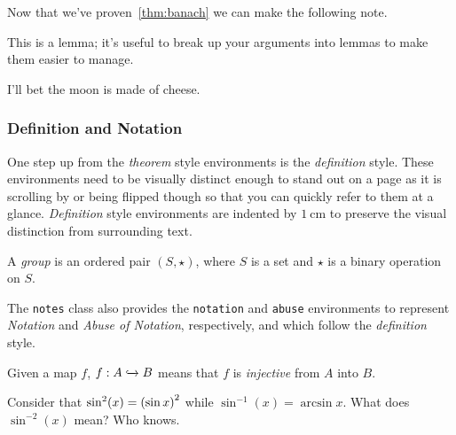 \documentclass[diagram]{notes}
\begin{document}
\begin{corollary}
Now that we've proven~\autoref{thm:banach} we can make the following note.
\end{corollary}
\begin{lemma}
This is a lemma; it's useful to break up your arguments into lemmas to make them easier to manage.
\end{lemma}
\begin{conjecture}
I'll bet the moon is made of cheese.
\end{conjecture}

\subsubsection{Definition and Notation}
One step up from the \emph{theorem} style environments is the \emph{definition} style. These environments need to be visually distinct enough to stand out on a page as it is scrolling by or being flipped though so that you can quickly refer to them at a glance. \emph{Definition} style environments are indented by $\SI{1}{\centi\meter}$ to preserve the visual distinction from surrounding text.

\begin{definition}[Group]
A \emph{group} is an ordered pair $(S, \star)$, where $S$ is a set and $\star$ is a binary operation on $S$.
\end{definition}

The \texttt{notes} class also provides the \texttt{notation} and \texttt{abuse} environments to represent \emph{Notation} and \emph{Abuse of Notation}, respectively, and which follow the \emph{definition} style.

\begin{notation}[$\xhookrightarrow{}$]
Given a map $f$, $f : A \xhookrightarrow{} B$ means that $f$ is \emph{injective} from $A$ into $B$.
\end{notation}

\begin{abuse}
Consider that $\sin^2(x) = \qty(\sin x)^2$ while $\sin^{-1}(x) = \arcsin x$. What does $\sin^{-2}(x)$ mean? Who knows.
\end{abuse}
\end{document}
